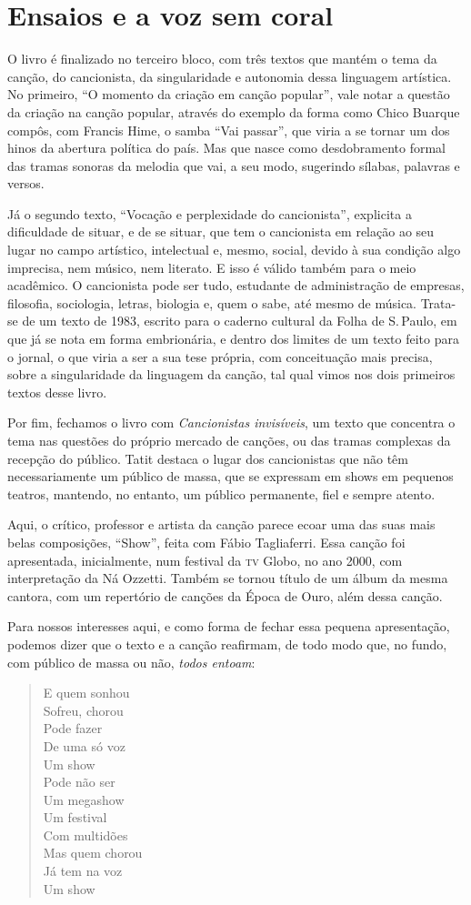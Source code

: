 \section{Ensaios e a voz sem coral}

O livro é finalizado no terceiro bloco, com três textos que
mantém o tema da canção, do cancionista, da singularidade e autonomia
dessa linguagem artística. No primeiro, ``O momento da criação em canção
popular'', vale notar a questão da criação na canção popular,
através do exemplo da forma como Chico Buarque compôs, com Francis Hime,
o samba ``Vai passar'', que viria a se tornar um dos hinos da abertura
política do país. Mas que nasce como desdobramento formal das tramas
sonoras da melodia que vai, a seu modo, sugerindo sílabas, palavras e
versos.

Já o segundo texto, ``Vocação e perplexidade do cancionista'',
explicita a dificuldade de situar, e de se situar, que tem o cancionista
em relação ao seu lugar no campo artístico, intelectual e, mesmo,
social, devido à sua condição algo imprecisa, nem músico, nem literato.
E isso é válido também para o meio acadêmico. O cancionista pode ser
tudo, estudante de administração de empresas, filosofia, sociologia,
letras, biologia e, quem o sabe, até mesmo de música. Trata-se de um
texto de 1983, escrito para o caderno cultural da Folha de S.\,Paulo, em
que já se nota em forma embrionária, e dentro dos limites de um texto
feito para o jornal, o que viria a ser a sua tese própria, com
conceituação mais precisa, sobre a singularidade da linguagem da canção,
tal qual vimos nos dois primeiros textos desse livro.

Por fim, fechamos o livro com \textit{Cancionistas invisíveis}, um
texto que concentra o tema nas questões do próprio mercado de canções,
ou das tramas complexas da recepção do público. Tatit destaca o lugar
dos cancionistas que não têm necessariamente um público de massa, que se
expressam em shows em pequenos teatros, mantendo, no entanto, um público
permanente, fiel e sempre atento.

Aqui, o crítico, professor e artista da canção parece ecoar uma das suas
mais belas composições, ``Show'', feita com Fábio Tagliaferri. Essa canção
foi apresentada, inicialmente, num festival da \textsc{tv} Globo, no ano 2000, com
interpretação da Ná Ozzetti. Também se tornou título de um álbum da
mesma cantora, com um repertório de canções da Época de Ouro, além dessa
canção.

Para nossos interesses aqui, e como forma de fechar essa pequena
apresentação, podemos dizer que o texto e a canção reafirmam, de todo
modo que, no fundo, com público de massa ou não, \textit{todos entoam}:

\begin{verse}
\small{E quem sonhou\\
Sofreu, chorou\\
Pode fazer\\
De uma só voz\\
Um show\\
Pode não ser\\
Um megashow\\
Um festival\\
Com multidões\\
Mas quem chorou\\
Já tem na voz\\
Um show}
\end{verse}
